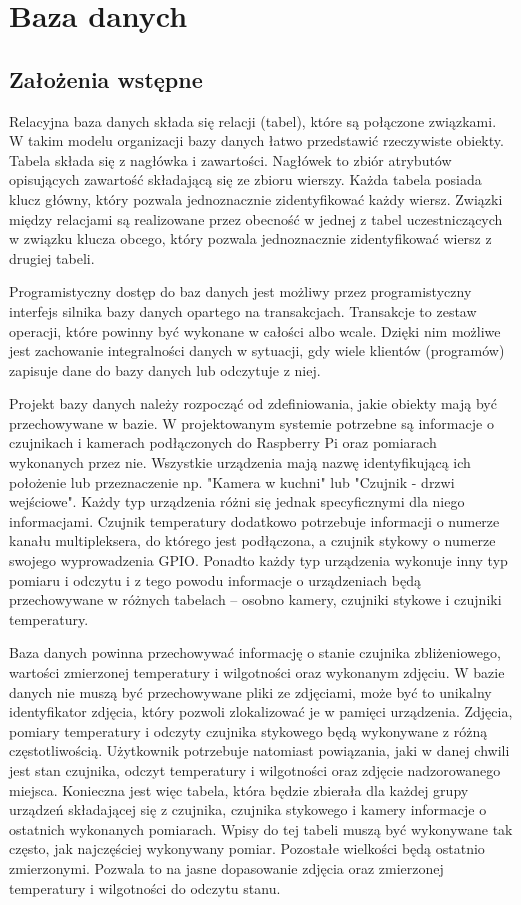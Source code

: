 \documentclass[a4paper,11pt,twoside]{article}
\begin{document}
\section{Baza danych}
\subsection{Założenia wstępne}
Relacyjna baza danych składa się relacji (tabel), które są połączone związkami. W takim modelu organizacji bazy danych łatwo przedstawić rzeczywiste obiekty. Tabela składa się z nagłówka i zawartości. Nagłówek to zbiór atrybutów opisujących zawartość składającą się ze zbioru wierszy. Każda tabela posiada klucz główny, który pozwala jednoznacznie zidentyfikować każdy wiersz. Związki między relacjami są realizowane przez obecność w jednej z tabel uczestniczących w związku klucza obcego, który pozwala jednoznacznie zidentyfikować wiersz z drugiej tabeli.

Programistyczny dostęp do baz danych jest możliwy przez programistyczny interfejs silnika bazy danych opartego na transakcjach. Transakcje to zestaw operacji, które powinny być wykonane w całości albo wcale. Dzięki nim możliwe jest zachowanie integralności danych w sytuacji, gdy wiele klientów (programów) zapisuje dane do bazy danych lub odczytuje z niej.

Projekt bazy danych należy rozpocząć od zdefiniowania, jakie obiekty mają być przechowywane w bazie. W projektowanym systemie potrzebne są informacje o czujnikach i kamerach podłączonych do Raspberry Pi oraz pomiarach wykonanych przez nie. Wszystkie urządzenia mają nazwę identyfikującą ich położenie lub przeznaczenie np. "Kamera w kuchni" lub "Czujnik - drzwi wejściowe". Każdy typ urządzenia różni się jednak specyficznymi dla niego informacjami. Czujnik temperatury dodatkowo potrzebuje informacji o numerze kanału multipleksera, do którego jest podłączona, a czujnik stykowy o numerze swojego wyprowadzenia GPIO. Ponadto każdy typ urządzenia wykonuje inny typ pomiaru i odczytu i z tego powodu informacje o urządzeniach będą przechowywane w różnych tabelach -- osobno kamery, czujniki stykowe i czujniki temperatury.

Baza danych powinna przechowywać informację o stanie czujnika zbliżeniowego, wartości zmierzonej temperatury i wilgotności oraz wykonanym zdjęciu. W bazie danych nie muszą być przechowywane pliki ze zdjęciami, może być to unikalny identyfikator zdjęcia, który pozwoli zlokalizować je w pamięci urządzenia. Zdjęcia, pomiary temperatury i odczyty czujnika stykowego będą wykonywane z różną częstotliwością. Użytkownik potrzebuje natomiast powiązania, jaki w danej chwili jest stan czujnika, odczyt temperatury i wilgotności oraz zdjęcie nadzorowanego miejsca. Konieczna jest więc tabela, która będzie zbierała dla każdej grupy urządzeń składającej się z czujnika, czujnika stykowego i kamery informacje o ostatnich wykonanych pomiarach. Wpisy do tej tabeli muszą być wykonywane tak często, jak najczęściej wykonywany pomiar. Pozostałe wielkości będą ostatnio zmierzonymi. Pozwala to na jasne dopasowanie zdjęcia oraz zmierzonej temperatury i wilgotności do odczytu stanu.
\end{document}
